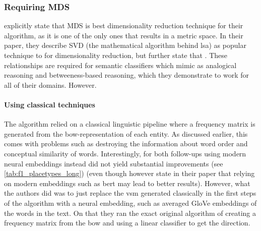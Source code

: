 \subsubsection{Requiring MDS}
\label{sec:discuss_mds}

\textcite{Derrac2015} explicitly state that MDS is best dimensionality reduction technique for their algorithm, as it is one of the only ones that results in a metric space. In their paper, they describe SVD (the mathematical algorithm behind \gls{lsa}) as popular technique to for dimensionality reduction, but further state that  \cite[14]{Derrac2015}. These relationships are required for semantic classifiers which mimic as analogical reasoning and betweeness-based reasoning, which they demonstrate to work for all of their domains. However.


\paragraph{Using classical techniques}

The algorithm relied on a classical linguistic pipeline where a frequency matrix is generated from the \gls{bow}-representation of each entity. As discussed earlier, this comes with problems such as destroying the information about word order and conceptual similarity of words. Interestingly, for both follow-ups \cite{Ager2018,Alshaikh2020} using modern neural embeddings instead did not yield substantial improvements (see \autoref{tab:f1_placetypes_long}) (even though however \cite{Alshaikh2020} state in their paper that relying on modern embeddings such as \gls{bert} \cite{Devlin2019} may lead to better results). However, what the authors did was to just replace the \gls{vsm} generated classically in the first steps of the algorithm with a neural embedding, such as averaged GloVe embeddings \cite{pennington2014glove} of the words in the text. On that they ran the exact original algorithm of creating a frequency matrix from the \gls{bow} and using a linear classifier to get the direction. 





